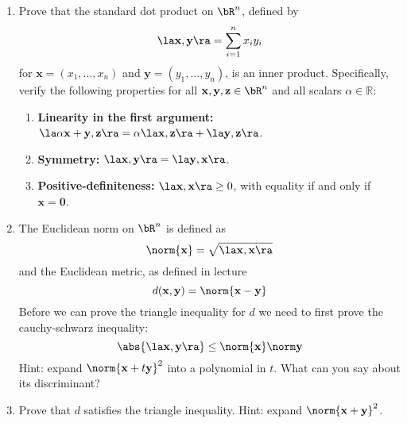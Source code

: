 \documentclass{pset}
\begin{document}
\begin{problem}
    \newcommand{\x}{\mathbf{x}}
    \newcommand{\y}{\mathbf{y}}
    \begin{enumerate}[label=(\alph*)]
        \item Prove that the standard dot product on \( \bR^n \), defined by
        \[
        \la \x, \y \ra = \sum_{i=1}^n x_i y_i
        \]
        for \( \x = (x_1, \ldots, x_n) \) and \( \y = (y_1, \ldots, y_n) \), is an inner product. Specifically, verify the following 
        properties for all \( \x, \y, \mathbf{z} \in \bR^n \) and all scalars \( \alpha \in \mathbb{R} \):
        \begin{enumerate}
            \item \textbf{Linearity in the first argument:} \( \la \alpha \x + \y, \mathbf{z} \ra = \alpha \la \x, \mathbf{z} \ra + \la \y, \mathbf{z} \ra \).
            \item \textbf{Symmetry:} \( \la \x, \y \ra = \la \y, \x \ra \).
            \item \textbf{Positive-definiteness:} \( \la \x, \x \ra \geq 0 \), with equality if and only if \( \x = \mathbf{0} \).
        \end{enumerate}
        \item The Euclidean norm on $\bR^n$ is defined as
        \[\norm{\x} = \sqrt{\la \x, \x\ra}\]
        and the Euclidean metric, as defined in lecture
        \[d(\x, \y) = \norm{\x-\y}\]
        Before we can prove the triangle inequality for $d$ we need to first prove the cauchy-schwarz inequality:
        \[\abs{\la\x,\y\ra} \leq \norm{\x}\norm\y\]
        \small Hint: expand $\norm{\x+t\y}^2$ into a polynomial in $t$. What can you say about its discriminant?
        \item Prove that $d$ satisfies the triangle inequality.
        \small Hint: expand $\norm{\x+\y}^2$.
    \end{enumerate}
\end{problem}
\end{document}
